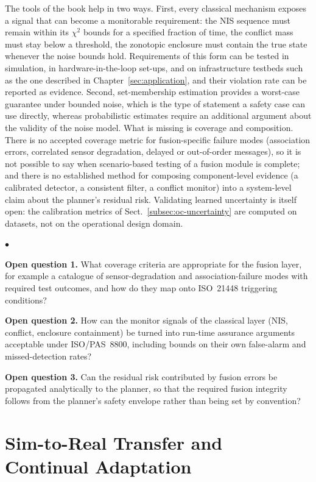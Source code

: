 \documentclass[graybox,envcountchap]{style/SNmono}
\newenvironment{list4a}{
  \begin{list}{$\bullet$}{
      \setlength{\itemsep}{0.05cm}
      \setlength{\labelsep}{0.2cm}
      \setlength{\labelwidth}{0.3cm}
      \setlength{\parsep}{0in}
      \setlength{\parskip}{0in}
      \setlength{\topsep}{0in}
      \setlength{\partopsep}{0in}
      \setlength{\leftmargin}{0.16in}}}
      {\end{list}}
\begin{document}
The tools of the book help in two ways. First, every classical mechanism exposes a signal that can become a monitorable requirement: the NIS sequence must remain within its $\chi^2$ bounds for a specified fraction of time, the conflict mass must stay below a threshold, the zonotopic enclosure must contain the true state whenever the noise bounds hold. Requirements of this form can be tested in simulation, in hardware-in-the-loop set-ups, and on infrastructure testbeds such as the one described in Chapter~\ref{sec:application}, and their violation rate can be reported as evidence. Second, set-membership estimation provides a worst-case guarantee under bounded noise, which is the type of statement a safety case can use directly, whereas probabilistic estimates require an additional argument about the validity of the noise model. What is missing is coverage and composition. There is no accepted coverage metric for fusion-specific failure modes (association errors, correlated sensor degradation, delayed or out-of-order messages), so it is not possible to say when scenario-based testing of a fusion module is complete; and there is no established method for composing component-level evidence (a calibrated detector, a consistent filter, a conflict monitor) into a system-level claim about the planner's residual risk. Validating learned uncertainty is itself open: the calibration metrics of Sect.~\ref{subsec:oc-uncertainty} are computed on datasets, not on the operational design domain.

\begin{list4a}
    \item \textbf{Open question 1.} What coverage criteria are appropriate for the fusion layer, for example a catalogue of sensor-degradation and association-failure modes with required test outcomes, and how do they map onto ISO~21448 triggering conditions?
    \item \textbf{Open question 2.} How can the monitor signals of the classical layer (NIS, conflict, enclosure containment) be turned into run-time assurance arguments acceptable under ISO/PAS~8800, including bounds on their own false-alarm and missed-detection rates?
    \item \textbf{Open question 3.} Can the residual risk contributed by fusion errors be propagated analytically to the planner, so that the required fusion integrity follows from the planner's safety envelope rather than being set by convention?
\end{list4a}

\section{Sim-to-Real Transfer and Continual Adaptation}
\label{subsec:oc-sim2real}
\end{document}
